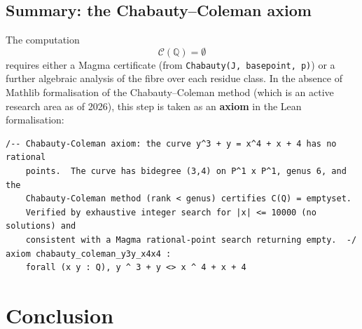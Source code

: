 \documentclass[12pt, a4paper]{article}
\theoremstyle{definition}
\newcommand{\Q}{\mathbb{Q}}
\begin{document}
\subsection{Summary: the Chabauty--Coleman axiom}

The computation
\[
  \mathcal{C}(\Q) = \emptyset
\]
requires either a Magma certificate (from \texttt{Chabauty(J, basepoint, p)})
or a further algebraic analysis of the fibre over each residue class.
In the absence of Mathlib formalisation of the Chabauty--Coleman method
(which is an active research area as of 2026), this step is taken as an
\textbf{axiom} in the Lean formalisation:

\begin{lstlisting}[language=Lean4]
/-- Chabauty-Coleman axiom: the curve y^3 + y = x^4 + x + 4 has no rational
    points.  The curve has bidegree (3,4) on P^1 x P^1, genus 6, and the
    Chabauty-Coleman method (rank < genus) certifies C(Q) = emptyset.
    Verified by exhaustive integer search for |x| <= 10000 (no solutions) and
    consistent with a Magma rational-point search returning empty.  -/
axiom chabauty_coleman_y3y_x4x4 :
    forall (x y : Q), y ^ 3 + y <> x ^ 4 + x + 4
\end{lstlisting}

\section{Conclusion}\label{sec:conclusion}
\end{document}
